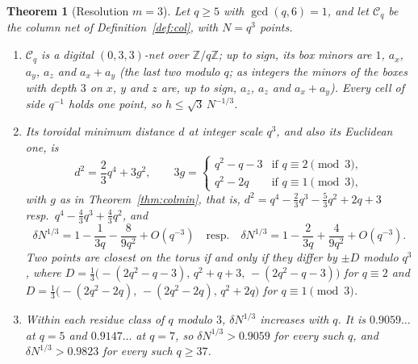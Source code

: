 \documentclass[11pt]{amsart}
\newtheorem{theorem}{Theorem}
\theoremstyle{definition}
\theoremstyle{plain}
\newcommand{\Z}{\mathbb{Z}}
\begin{document}
\begin{theorem}[Resolution $m=3$]\label{thm:col}
Let $q\ge5$ with $\gcd(q,6)=1$, and let $\mathcal C_q$ be the column net of Definition~\ref{def:col}, with $N=q^3$ points.
\begin{enumerate}
\item $\mathcal C_q$ is a digital $(0,3,3)$-net over $\Z/q\Z$; up to sign, its box minors are $1$, $a_x$, $a_y$, $a_z$ and $a_x+a_y$ (the last two modulo $q$; as integers the minors of the boxes with depth $3$ on $x$, $y$ and $z$ are, up to sign, $a_z$, $a_z$ and $a_x+a_y$). Every cell of side $q^{-1}$ holds one point, so $h\le\sqrt3\,N^{-1/3}$.
\item Its toroidal minimum distance $d$ at integer scale $q^3$, and also its Euclidean one, is
\[
d^2=\frac23q^4+3g^2,\qquad 3g=\begin{cases}q^2-q-3&\text{if }q\equiv2\pmod3,\\ q^2-2q&\text{if }q\equiv1\pmod3,\end{cases}
\]
with $g$ as in Theorem~\ref{thm:colmin},
that is, $d^2=q^4-\frac23q^3-\frac53q^2+2q+3$ resp.\ $q^4-\frac43q^3+\frac43q^2$, and
\[
\delta N^{1/3}=1-\frac1{3q}-\frac8{9q^2}+O(q^{-3})\quad\text{resp.}\quad\delta N^{1/3}=1-\frac2{3q}+\frac4{9q^2}+O(q^{-3}).
\]
Two points are closest on the torus if and only if they differ by $\pm D$ modulo $q^3$, where $D=\frac13\bigl(-(2q^2-q-3),\,q^2+q+3,\,-(2q^2-q-3)\bigr)$ for $q\equiv2$ and $D=\frac13\bigl(-(2q^2-2q),\,-(2q^2-2q),\,q^2+2q\bigr)$ for $q\equiv1\pmod3$.
\item Within each residue class of $q$ modulo $3$, $\delta N^{1/3}$ increases with $q$. It is $0.9059\ldots$ at $q=5$ and $0.9147\ldots$ at $q=7$, so $\delta N^{1/3}>0.9059$ for every such $q$, and $\delta N^{1/3}>0.9823$ for every such $q\ge37$.
\end{enumerate}
\end{theorem}
\end{document}
